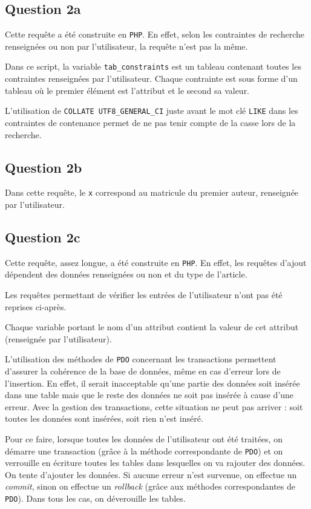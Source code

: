 \documentclass[a4paper, 12pt]{article}
\begin{document}
	\subsection{Question 2a}
	Cette requête a été construite en \texttt{PHP}. En effet, selon les contraintes de recherche renseignées ou non par l'utilisateur, la requête n'est pas la même.\par
	Dans ce script, la variable \texttt{tab\_constraints} est un tableau contenant toutes les contraintes renseignées par l'utilisateur. Chaque contrainte est sous forme d'un tableau où le premier élément est l'attribut et le second sa valeur.\par
	L'utilisation de \texttt{COLLATE UTF8\_GENERAL\_CI} juste avant le mot clé \texttt{LIKE} dans les contraintes de contenance permet de ne pas tenir compte de la casse lors de la recherche.
	
	\subsection{Question 2b}
	Dans cette requête, le \texttt{x} correspond au matricule du premier auteur, renseignée par l'utilisateur.
	
	\subsection{Question 2c}
	Cette requête, assez longue, a été construite en \texttt{PHP}. En effet, les requêtes d'ajout dépendent des données renseignées ou non et du type de l'article.\par
	Les requêtes permettant de vérifier les entrées de l'utilisateur n'ont pas été reprises ci-après.\par
	Chaque variable portant le nom d'un attribut contient la valeur de cet attribut (renseignée par l'utilisateur).\par
	L'utilisation des méthodes de \texttt{PDO} concernant les transactions permettent d'assurer la cohérence de la base de données, même en cas d'erreur lors de l'insertion. En effet, il serait inacceptable qu'une partie des données soit insérée dans une table mais que le reste des données ne soit pas insérée à cause d'une erreur. Avec la gestion des transactions, cette situation ne peut pas arriver : soit toutes les données sont insérées, soit rien n'est inséré.\par
	Pour ce faire, lorsque toutes les données de l'utilisateur ont été traitées, on démarre une transaction (grâce à la méthode correspondante de \texttt{PDO}) et on verrouille en écriture toutes les tables dans lesquelles on va rajouter des données. On tente d'ajouter les données. Si aucune erreur n'est survenue, on effectue un {\it commit}, sinon on effectue un {\it rollback} (grâce aux méthodes correspondantes de \texttt{PDO}). Dans tous les cas, on déverouille les tables.
	
\end{document}
